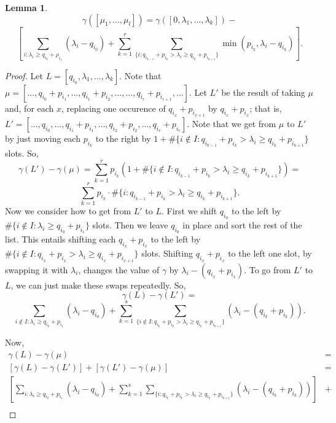 \documentclass[12pt,psamsfonts]{article}
\newtheorem{lemma}[theorem]{Lemma}
\begin{document}
\begin{lemma}
    \[\gamma([\mu_1, ..., \mu_l]) = \gamma([0, \lambda_1, ..., \lambda_k]) - \] 
    \[\left[\sum_{i : \lambda_i \geq q_{i_0} + \rho_{i_1}} (\lambda_i - q_{i_0}) + \sum_{k = 1}^r \sum_{\{i : q_{i_{k - 1}} + p_{i_k} > \lambda_i \geq q_{i_k} + p_{i_{k + 1}}\}} \min(p_{i_k}, \lambda_i - q_{i_k})\right].\]
\end{lemma}
\begin{proof}
    Let \(L = [q_{i_0}, \lambda_1, ..., \lambda_k]\).
    Note that \(\mu = [..., q_{i_0} + p_{i_1}, ..., q_{i_1} + p_{i_2}, ..., ..., q_{i_r} + p_{i_{r + 1}}, ...]\).
    Let \(L'\) be the result of taking \(\mu\) and, for each \(x\), replacing one occurence of \(q_{i_x} + p_{i_{x + 1}}\) by \(q_{i_x} + p_{i_x}\); that is,
    \(L' = [..., q_{i_0}, ..., q_{i_1} + p_{i_1}, ..., q_{i_2} + p_{i_2}, ..., q_{i_r} + p_{i_r}]\).
    Note that we get from \(\mu\) to \(L'\) by just moving each \(p_{i_k}\) to the right by \(1 + \#\{i \notin I : q_{i_{k - 1}} + p_{i_k} > \lambda_i \geq q_{i_k} + p_{i_{k + 1}}\}\) slots.
    So,
    \[\gamma(L') - \gamma(\mu) = \sum_{k = 1}^r p_{i_k} (1 + \#\{i \notin I : q_{i_{k - 1}} + p_{i_k} > \lambda_i \geq q_{i_k} + p_{i_{k + 1}}\}) = \]
    \[\sum_{k = 1}^r p_{i_k} \cdot \#\{i : q_{i_{k - 1}} + p_{i_k} > \lambda_i \geq q_{i_k} + p_{i_{k + 1}}\}.\]
    Now we consider how to get from \(L'\) to \(L\).
    First we shift \(q_{i_0}\) to the left by \(\#\{i \notin I : \lambda_i \geq q_{i_0} + p_{i_1}\}\) slots.
    Then we leave \(q_{i_0}\) in place and sort the rest of the list.
    This entails shifting each \(q_{i_x} + p_{i_x}\) to the left by \(\#\{i \notin I : q_{i_x} + p_{i_x} > \lambda_i \geq q_{i_x} + p_{i_{x + 1}}\}\) slots.
    Shifting \(q_{i_x} + p_{i_x}\) to the left one slot, by swapping it with \(\lambda_i\), changes the value of \(\gamma\) by \(\lambda_i - (q_{i_x} + p_{i_x})\).
    To go from \(L'\) to \(L\), we can just make these swaps repeatedly.  
    So,
    \[\gamma(L) - \gamma(L') = \]
    \[\sum_{i \notin I : \lambda_i \geq q_{i_0} + p_{i_1}} (\lambda_i - q_{i_0}) + \sum_{k = 1}^s \sum_{\{i \notin I : q_{i_k} + p_{i_k} > \lambda_i \geq q_{i_k} + p_{i_{k + 1}}\}} (\lambda_i - (q_{i_k} + p_{i_k})).\]
    \par Now,
    \begin{align*}
        \gamma(L) - \gamma(\mu) & = \\
        [\gamma(L) - \gamma(L')] + [\gamma(L') - \gamma(\mu)] & = \\
        \left[\sum_{i : \lambda_i \geq q_{i_0} + p_{i_1}} (\lambda_i - q_{i_0}) + \sum_{k = 1}^s \sum_{\{i : q_{i_k} + p_{i_k} > \lambda_i \geq q_{i_k} + p_{i_{k + 1}}\}} (\lambda_i - (q_{i_k} + p_{i_k}))\right] & + \\

\end{align*}
\end{proof}
\end{document}

